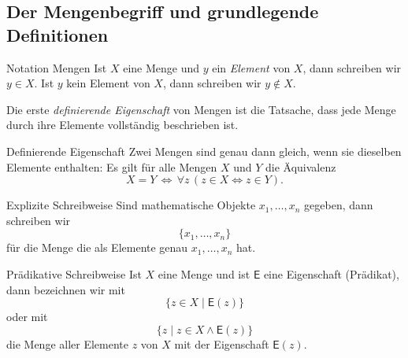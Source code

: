 \subsection{Der Mengenbegriff und grundlegende Definitionen}

\begin{concept}{Notation Mengen}
Ist $X$ eine Menge und $y$ ein \textit{Element} von $X$, dann schreiben wir $y\in X$. Ist $y$ kein Element von $X$, dann schreiben wir $y\notin X$.
\end{concept}

\begin{remark}
    Die erste \textit{definierende Eigenschaft} von Mengen ist die Tatsache, dass jede Menge durch ihre Elemente vollständig beschrieben ist.
\end{remark}


\begin{definition}{Definierende Eigenschaft}
Zwei Mengen sind genau dann gleich, wenn sie dieselben Elemente enthalten: Es gilt für alle Mengen $X$ und $Y$ die Äquivalenz
\[
X=Y\,\Leftrightarrow\,\forall z\, (z\in X\Leftrightarrow z\in Y).
\]
\end{definition}


\begin{concept}{Explizite Schreibweise}
Sind mathematische Objekte $x_1,\dots,x_n$ gegeben, dann schreiben wir
\[
\{x_1,\dots,x_n\}
\]
für die Menge die als Elemente genau $x_1,\dots,x_n$ hat.
\end{concept}

\begin{comment}
Wir führen im Folgenden einige Operationen und Schreibweisen ein, mithilfe derer wir neue Mengen (aus bereits vorhandenen) generieren können.
Wir erhalten beispielsweise die Menge aller Primzahlen aus der Menge der natürlichen Zahlen, indem wir
\[
\{p\in\N\mid p\text{ hat genau $2$ Teiler}\}
\]
schreiben.
\end{comment}

\begin{concept}{Prädikative Schreibweise}
Ist $X$ eine Menge und ist $\mathsf{E}$ eine Eigenschaft (Prädikat), dann bezeichnen wir mit
\[
\big\{z\in X\mid \mathsf{E}(z)\big\}
\]
oder mit
\[
\big\{z\mid z\in X\land\mathsf{E}(z)\big\}
\]
die Menge aller Elemente $z$ von $X$ mit der Eigenschaft $\mathsf{E}(z)$.
\end{concept}


